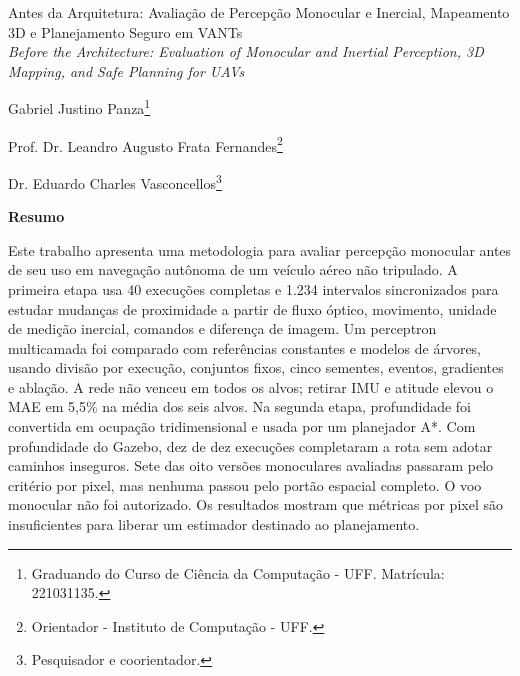 \documentclass[article,a4paper,12pt,brazil,sumario=tradicional]{abntex2}
\renewcommand{\imprimircapa}{%
\begin{capa}%
 \center
  \ABNTEXchapterfont\large\imprimirinstituicao
   \vfill
    \ABNTEXchapterfont\large\imprimirautor
    \vfill
    \begin{center}
    \ABNTEXchapterfont\bfseries\LARGE\imprimirtitulo
    \vfill
    \end{center}
    
    \large\imprimirlocal
    
    \large\imprimirdata
\end{capa}
}
\begin{document}

\imprimirfolhaderosto

%

\pagebreak


\pagebreak
\textual
\begin{center}
\Large {Antes da Arquitetura: Avaliação de Percepção Monocular e Inercial, Mapeamento 3D e Planejamento Seguro em VANTs\\
\textit{Before the Architecture: Evaluation of Monocular and Inertial Perception, 3D Mapping, and Safe Planning for UAVs}}
\end{center}
\vspace{.2cm} 

\begin{flushright}
Gabriel Justino Panza\footnote{Graduando do Curso de Ciência da Computação - UFF. Matrícula: 221031135.}

Prof. Dr. Leandro Augusto Frata Fernandes\footnote{Orientador - Instituto de Computação - UFF.}

Dr. Eduardo Charles Vasconcellos\footnote{Pesquisador e coorientador.}
\end{flushright}

\vspace{\onelineskip}

\begin{center}
    \textbf{Resumo}
\end{center}

\vspace{-.3cm}

\noindent
Este trabalho apresenta uma metodologia para avaliar percepção monocular antes de seu uso em navegação autônoma de um veículo aéreo não tripulado. A primeira etapa usa 40 execuções completas e 1.234 intervalos sincronizados para estudar mudanças de proximidade a partir de fluxo óptico, movimento, unidade de medição inercial, comandos e diferença de imagem. Um perceptron multicamada foi comparado com referências constantes e modelos de árvores, usando divisão por execução, conjuntos fixos, cinco sementes, eventos, gradientes e ablação. A rede não venceu em todos os alvos; retirar IMU e atitude elevou o MAE em 5,5\% na média dos seis alvos. Na segunda etapa, profundidade foi convertida em ocupação tridimensional e usada por um planejador A*. Com profundidade do Gazebo, dez de dez execuções completaram a rota sem adotar caminhos inseguros. Sete das oito versões monoculares avaliadas passaram pelo critério por pixel, mas nenhuma passou pelo portão espacial completo. O voo monocular não foi autorizado. Os resultados mostram que métricas por pixel são insuficientes para liberar um estimador destinado ao planejamento.
\end{document}
